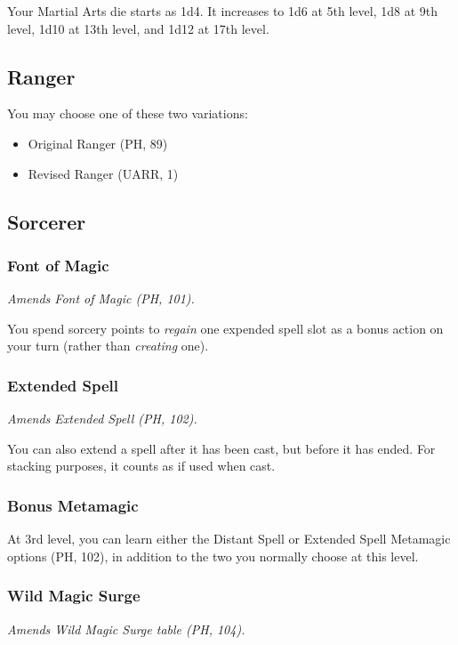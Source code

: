 \documentclass[House_Rules.tex]{subfiles}
\begin{document}
Your Martial Arts die starts as 1d4. It increases to 1d6 at 5th level, 1d8 at 9th level, 1d10 at 13th level, and 1d12 at 17th level.



\subsection{Ranger}

You may choose one of these two variations:

\begin{itemize}
    \item Original Ranger (PH, 89)
    \item Revised Ranger (UARR, 1)

\end{itemize}

\subsection{Sorcerer}

\subsubsection{Font of Magic}
\textit{Amends Font of Magic (PH, 101).}

You spend sorcery points to \textit{regain} one expended spell slot as a bonus action on your turn (rather than \textit{creating} one).

\subsubsection{Extended Spell}
\textit{Amends Extended Spell (PH, 102).}

You can also extend a spell after it has been cast, but before it has ended. For stacking purposes, it counts as if used when cast.

\subsubsection{Bonus Metamagic}
At 3rd level, you can learn either the Distant Spell or Extended Spell Metamagic options (PH, 102), in addition to the two you normally choose at this level.

\subsubsection{Wild Magic Surge}
\textit{Amends Wild Magic Surge table (PH, 104).}
\end{document}
